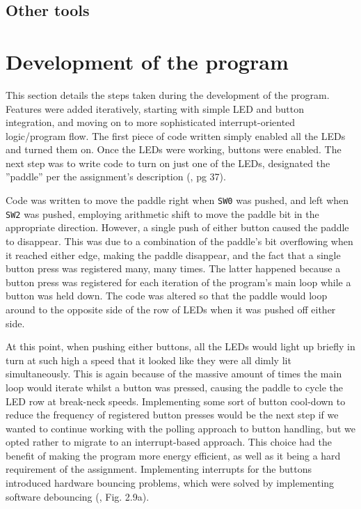     \subsection{Other tools}

        

\section{Development of the program}

This section details the steps taken during the development of the program.
Features were added iteratively, starting with simple LED and button integration, and moving on to more sophisticated interrupt-oriented logic/program flow.
The first piece of code written simply enabled all the LEDs and turned them on. Once the LEDs were working, buttons were enabled.
The next step was to write code to turn on just one of the LEDs, designated the ''paddle'' per the assignment's description (\cite{lab-compendium}, pg 37).

Code was written to move the paddle right when \texttt{SW0} was pushed, and left when \texttt{SW2} was pushed, employing arithmetic shift to move the paddle bit in the appropriate direction.
However, a single push of either button caused the paddle to disappear.
This was due to a combination of the paddle's bit overflowing when it reached either edge, making the paddle disappear, and the fact that a single button press was registered many, many times.
The latter happened because a button press was registered for each iteration of the program's main loop while a button was held down.
The code was altered so that the paddle would loop around to the opposite side of the row of LEDs when it was pushed off either side.

At this point, when pushing either buttons, all the LEDs would light up briefly in turn at such high a speed that it looked like they were all dimly lit simultaneously.
This is again because of the massive amount of times the main loop would iterate whilst a button was pressed, causing the paddle to cycle the LED row at break-neck speeds.
Implementing some sort of button cool-down to reduce the frequency of registered button presses would be the next step if we wanted to continue working with the polling approach to button handling, but we opted rather to migrate to an interrupt-based approach.
This choice had the benefit of making the program more energy efficient, as well as it being a hard requirement of the assignment.
Implementing interrupts for the buttons introduced hardware bouncing problems, which were solved by implementing software debouncing (\cite{lab-compendium}, Fig. 2.9a).

